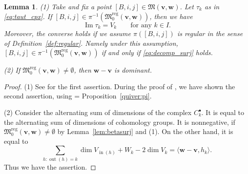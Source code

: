 \documentclass[12pt]{amsart}
\def\frak{\mathfrak}
\newcommand{\rom}{\textup}
\newtheorem{Lemma}[equation]{Lemma}
\theoremstyle{definition}
\theoremstyle{remark}
\newtheorem{Remark}[equation]{Remark}
\numberwithin{equation}{subsection}
\newcommand{\lemref}[1]{Lemma~\ref{#1}}
\newcommand{\propref}[1]{Proposition~\ref{#1}}
\newcommand{\defref}[1]{Definition~\ref{#1}}
\newcommand{\Ima}{\operatorname{Im}}
\newcommand{\vin}{\operatorname{in}} %
\newcommand{\vout}{\operatorname{out}} %
\newcommand{\M}{{\frak M}} %
\newcommand{\Mreg}{{\frak M_0^{\operatorname{reg}}}}
\newcommand{\bv}{{\mathbf v}} %
\newcommand{\bw}{{\mathbf w}} %
\begin{document}
\begin{Lemma}\label{lem:surj}
\rom{(1)} Take and fix a point $[B,i,j]\in\M(\bv,\bw)$.
Let $\tau_k$ as in \eqref{eq:taut_cpx}.
If $[B, i, j]\in\pi^{-1}(\Mreg(\bv,\bw))$,
then we have
\begin{equation}\label{eq:decomp_surj}
     \Ima \tau_k
     = V_k \qquad
     \text{for any $k\in I$}.
\end{equation}
%
Moreover, the converse holds if we assume
$\pi([B,i,j])$ is regular in the sense of \defref{def:regular}. Namely
under this assumption, $[B,i,j]\in\pi^{-1}(\Mreg(\bv,\bw))$ 
if and only if \eqref{eq:decomp_surj} holds.

\rom{(2)} If $\Mreg(\bv,\bw)\neq\emptyset$, then $\bw-\bv$ is dominant.
\end{Lemma}


\begin{proof}
(1) See \cite[4.7]{Na-alg} for the first assertion.
%
During the proof of \cite[7.2]{Na-alg}, we have shown the second
assertion, using \cite[3.10]{Na-alg} = \propref{quiver:pi}.

(2) Consider the alternating sum of dimensions of the complex
$C_k^\bullet$. It is equal to the alternating sum of dimensions of
cohomology groups. It is nonnegative, if $\Mreg(\bv,\bw)\neq\emptyset$ 
by \lemref{lem:betasurj} and (1). On the other hand, it is equal to
\begin{equation*}
   \sum_{h:\vout(h)=k} \dim V_{\vin(h)} + W_k - 2\dim V_k
   = \langle \bw - \bv, h_k\rangle.
\end{equation*}
Thus we have the assertion.
\end{proof}

\end{document}
